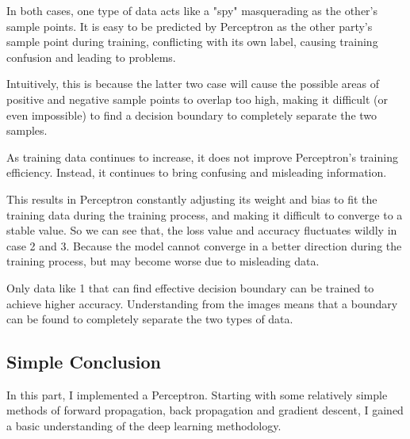 In both cases, one type of data acts like a "spy" masquerading as the other's sample points.
It is easy to be predicted by Perceptron as the other party's sample point during training,
conflicting with its own label,
causing training confusion and leading to problems.

Intuitively, this is because the latter two case will cause the possible areas of positive and negative sample points to overlap too high,
making it difficult (or even impossible) to find a decision boundary to completely separate the two samples.

As training data continues to increase, it does not improve Perceptron's training efficiency. 
Instead, it continues to bring confusing and misleading information.

This results in Perceptron constantly adjusting its weight and bias to fit the training data during the training process, and making it difficult to converge to a stable value.
So we can see that, the loss value and accuracy fluctuates wildly in case 2 and 3.
Because the model cannot converge in a better direction during the training process, but may become worse due to misleading data.

Only data like 1 that can find effective decision boundary can be trained to achieve higher accuracy.
Understanding from the images means that a boundary can be found to completely separate the two types of data.

\subsection{Simple Conclusion}

In this part, I implemented a Perceptron.
Starting with some relatively simple methods of forward propagation, back propagation and gradient descent, I gained a basic understanding of the deep learning methodology.